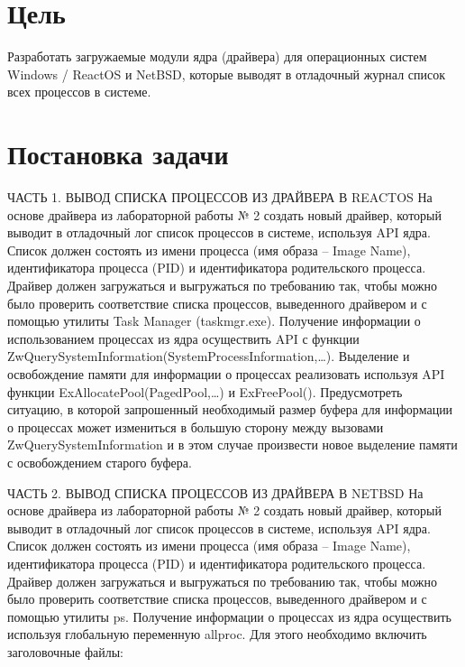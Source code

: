 \documentclass[a4paper, 14pt]{extarticle}
\begin{document}
\section{Цель} \label{sec:Goal}
\begin{flushleft}
Разработать загружаемые модули ядра (драйвера) для
операционных систем Windows / ReactOS и NetBSD, которые выводят в
отладочный журнал список всех процессов в системе.

\end{flushleft}
\pagebreak

\section{Постановка задачи} \label{sec:ToDo}
\begin{flushleft}
ЧАСТЬ 1. ВЫВОД СПИСКА ПРОЦЕССОВ ИЗ ДРАЙВЕРА В REACTOS \newline \newline
На основе драйвера из лабораторной работы № 2 создать новый драйвер,
который выводит в отладочный лог список процессов в системе, используя API
ядра. Список должен состоять из имени процесса (имя образа – Image Name),
идентификатора процесса (PID) и идентификатора родительского процесса.
Драйвер должен загружаться и выгружаться по требованию так, чтобы
можно было проверить соответствие списка процессов, выведенного драйвером
и с помощью утилиты Task Manager (taskmgr.exe).\newline
Получение информации о использованием процессах из ядра осуществить API с функции
ZwQuerySystemInformation(SystemProcessInformation,…).
Выделение и
освобождение памяти для информации о процессах реализовать используя API
функции ExAllocatePool(PagedPool,…) и ExFreePool(). Предусмотреть ситуацию,
в которой запрошенный необходимый размер буфера для информации о
процессах
может
измениться
в
большую сторону
между
вызовами ZwQuerySystemInformation и в этом случае произвести новое выделение памяти
с освобождением старого буфера.\newline

ЧАСТЬ 2. ВЫВОД СПИСКА ПРОЦЕССОВ ИЗ ДРАЙВЕРА В NETBSD \newline \newline
На основе драйвера из лабораторной работы № 2 создать новый драйвер,
который выводит в отладочный лог список процессов в системе, используя API
ядра. Список должен состоять из имени процесса (имя образа – Image Name),
идентификатора процесса (PID) и идентификатора родительского процесса. \newline
Драйвер должен загружаться и выгружаться по требованию так, чтобы
можно было проверить соответствие списка процессов, выведенного драйвером
и с помощью утилиты ps. \newline
Получение информации о процессах из ядра осуществить используя
глобальную переменную allproc. Для этого необходимо включить заголовочные
файлы:\newline


\end{flushleft}
\end{document}
